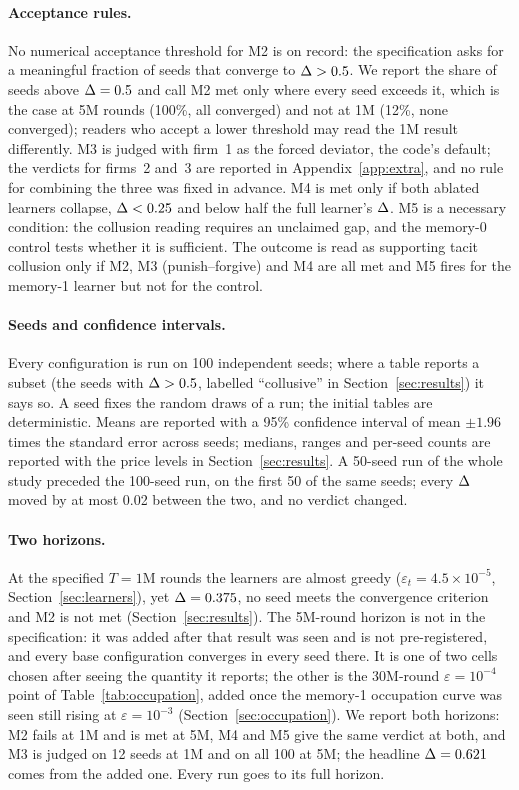 \paragraph{Acceptance rules.}
No numerical acceptance threshold for M2 is on record: the specification asks for a meaningful fraction of seeds that converge to $\Delta > 0.5$. We report the share of seeds above $\Delta = 0.5$ and call M2 met only where every seed exceeds it, which is the case at 5M rounds (100\%, all converged) and not at 1M (12\%, none converged); readers who accept a lower threshold may read the 1M result differently. M3 is judged with firm~1 as the forced deviator, the code's default; the verdicts for firms~2 and~3 are reported in Appendix~\ref{app:extra}, and no rule for combining the three was fixed in advance. M4 is met only if both ablated learners collapse, $\Delta < 0.25$ and below half the full learner's $\Delta$. M5 is a necessary condition: the collusion reading requires an unclaimed gap, and the memory-0 control tests whether it is sufficient. The outcome is read as supporting tacit collusion only if M2, M3 (punish--forgive) and M4 are all met and M5 fires for the memory-1 learner but not for the control.

\paragraph{Seeds and confidence intervals.}
Every configuration is run on 100 independent seeds; where a table reports a subset (the seeds with $\Delta > 0.5$, labelled ``collusive'' in Section~\ref{sec:results}) it says so. A seed fixes the random draws of a run; the initial tables are deterministic. Means are reported with a 95\% confidence interval of mean $\pm 1.96$ times the standard error across seeds; medians, ranges and per-seed counts are reported with the price levels in Section~\ref{sec:results}. A 50-seed run of the whole study preceded the 100-seed run, on the first 50 of the same seeds; every $\Delta$ moved by at most 0.02 between the two, and no verdict changed.

\paragraph{Two horizons.}
At the specified $T = 1$M rounds the learners are almost greedy ($\varepsilon_t = 4.5 \times 10^{-5}$, Section~\ref{sec:learners}), yet $\Delta = 0.375$, no seed meets the convergence criterion and M2 is not met (Section~\ref{sec:results}). The 5M-round horizon is not in the specification: it was added after that result was seen and is not pre-registered, and every base configuration converges in every seed there. It is one of two cells chosen after seeing the quantity it reports; the other is the 30M-round $\varepsilon = 10^{-4}$ point of Table~\ref{tab:occupation}, added once the memory-1 occupation curve was seen still rising at $\varepsilon = 10^{-3}$ (Section~\ref{sec:occupation}). We report both horizons: M2 fails at 1M and is met at 5M, M4 and M5 give the same verdict at both, and M3 is judged on 12 seeds at 1M and on all 100 at 5M; the headline $\Delta = 0.621$ comes from the added one. Every run goes to its full horizon.

